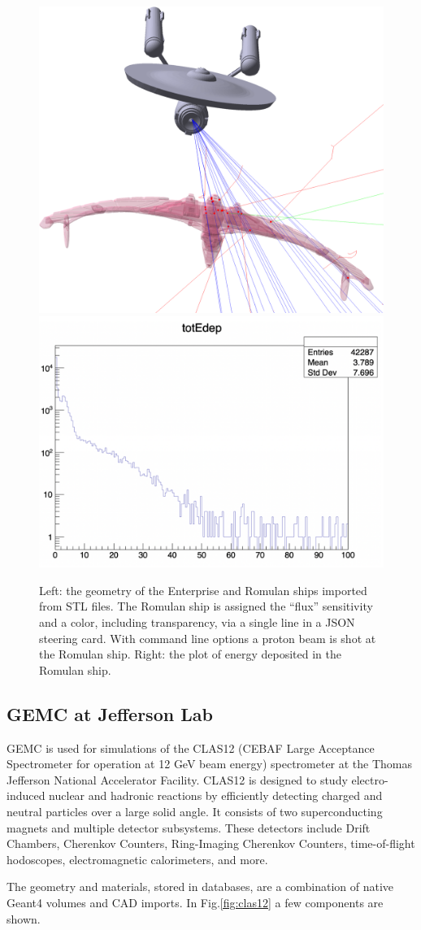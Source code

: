 \begin{figure}[h]
    \centering
    \includegraphics[width=.5\textwidth]{img/startrek}
    \includegraphics[width=.48\textwidth]{img/startrek_edep}
    \caption{Left: the geometry of the Enterprise and Romulan ships imported from STL files.
    The Romulan ship is assigned the ``flux'' sensitivity and a color, including transparency, via a single line in a JSON steering card.
    With command line options a proton beam is shot at the Romulan ship.
    Right: the plot of energy deposited in the Romulan ship.}
    \label{fig:cad_import}
\end{figure}

\subsection{GEMC at Jefferson Lab}
\label{subsec:clas12}
GEMC is used for simulations of the CLAS12 (CEBAF Large Acceptance Spectrometer
for operation at 12 GeV beam energy) \cite{clas12_gemc} spectrometer at the Thomas Jefferson National
Accelerator Facility.
CLAS12 is designed to study electro-induced nuclear and hadronic reactions
by efficiently detecting charged and neutral particles over a large solid angle.
It consists of two superconducting magnets and multiple detector subsystems.
These detectors include Drift Chambers, Cherenkov Counters, Ring-Imaging Cherenkov Counters,
time-of-flight hodoscopes, electromagnetic calorimeters, and more.

The geometry and materials, stored in databases, are a combination of native Geant4 volumes and
CAD imports. In Fig.\ref{fig:clas12} a few components are shown.


